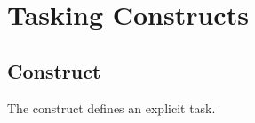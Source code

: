 %
%
%
%
%
%
%
%
%
%
%
%
%


\section{Tasking Constructs}
\label{sec:Tasking Constructs}
\subsection{ Construct}
\label{subsec:task Construct}
\summary
The  construct defines an explicit task.

